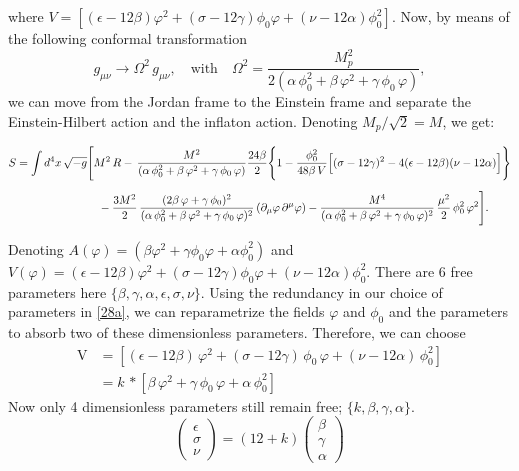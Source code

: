 \documentclass[aps,prd,reprint,preprintnumbers,showpacs,floatfix,nofootinbib,superscript address]{revtex4-2}
\begin{document}
where $V = [(\epsilon - 12\beta) \varphi^2 + (\sigma - 12\gamma) \phi_0 \varphi + (\nu - 12\alpha)\phi^2_0]$. Now, by means of the following conformal transformation 
\[
g_{\mu\nu}\rightarrow \Omega^2\,g_{\mu\nu},\quad\text{with}\quad \Omega^2 = \frac{M_p^2}{2(\alpha\,\phi_0^2+\beta\,\varphi^2+\gamma\,\phi_0\,\varphi)},
\]
we can move from the Jordan frame to the Einstein frame and separate the Einstein-Hilbert action and the inflaton action. Denoting $M_p/\sqrt{2} = M$, we get:
\begin{widetext}
\begin{subequations}\label{33a}
\begin{align}
S = \int d^4x\, \sqrt{-g} &\Biggl[ M^2\, R - \,\frac{M^2}{(\alpha\,\phi_0^2+\beta\,\varphi^2+\gamma\,\phi_0\,\varphi)}
\frac{24\beta}{2}\Biggl\{1 - \frac{\phi_0^2}{48\beta\,V}\Bigl[(\sigma-12\gamma)^2-4(\epsilon-12\beta)(\nu-12\alpha)\Bigr]\Biggr\} \nonumber\\[2mm]
&\quad - \frac{3M^2}{2}\,\frac{(2\beta\,\varphi+\gamma\,\phi_0)^2}{(\alpha\,\phi_0^2+\beta\,\varphi^2+\gamma\,\phi_0\,\varphi)^2}\,(\partial_{\mu}\varphi\,\partial^{\mu}\varphi) - \frac{M^4}{(\alpha\,\phi_0^2+\beta\,\varphi^2+\gamma\,\phi_0\,\varphi)^2}\,\frac{\mu^2}{2}\,\phi_0^2\,\varphi^2 \Biggr].
\end{align}
\end{subequations}
\end{widetext}
Denoting $A(\varphi) = (\beta\varphi^2+\gamma\phi_0\varphi+\alpha\phi_0^2)$ and $V(\varphi) = (\epsilon - 12\beta) \varphi^2 + (\sigma - 12\gamma) \phi_0  \varphi + (\nu - 12\alpha)\phi^2_0$. There are 6 free parameters here $\{ \beta, \gamma, \alpha , \epsilon, \sigma, \nu \}$. Using the redundancy in our choice of parameters in \ref{28a}, we can reparametrize the fields $\varphi$ and $\phi_0$ and the parameters to absorb two of these dimensionless parameters. Therefore, we can choose
\[
\begin{split}
\text{V} &= \left[(\epsilon - 12\beta)\,\varphi^2 + (\sigma - 12\gamma)\,\phi_0\,\varphi + (\nu - 12\alpha)\,\phi_0^2\right] \\
         &= k\,*\left[\beta\,\varphi^2 + \gamma\,\phi_0\,\varphi + \alpha\,\phi_0^2\right]
\end{split}
\]
Now only 4 dimensionless parameters still remain free; $\{k, \beta, \gamma, \alpha \}$.
\begin{equation}
    \begin{pmatrix}
        \epsilon \\ \sigma \\ \nu 
    \end{pmatrix}
    = (12+k)
    \begin{pmatrix}
        \beta \\ \gamma \\ \alpha
    \end{pmatrix}
\end{equation}
\end{document}
